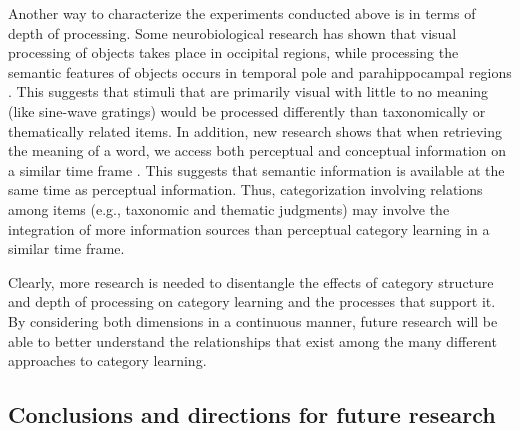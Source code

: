 \documentclass[../dissertation.tex]{subfiles}
\begin{document}
	Another way to characterize the experiments conducted above is in terms of depth of processing. Some neurobiological research has shown that visual processing of objects takes place in occipital regions, while processing the semantic features of objects occurs in temporal pole and parahippocampal regions \citep{Man2018}. This suggests that stimuli that are primarily visual with little to no meaning (like sine-wave gratings) would be processed differently than taxonomically or thematically related items. In addition, new research shows that when retrieving the meaning of a word, we access both perceptual and conceptual information on a similar time frame \citep{Borghesani2019}. This suggests that semantic information is available at the same time as perceptual information. Thus, categorization involving relations among items (e.g., taxonomic and thematic judgments) may involve the integration of more information sources than perceptual category learning in a similar time frame. \par 
	Clearly, more research is needed to disentangle the effects of category structure and depth of processing on category learning and the processes that support it. By considering both dimensions in a continuous manner, future research will be able to better understand the relationships that exist among the many different approaches to category learning. 
	
\subsection{Conclusions and directions for future research}
\end{document}
